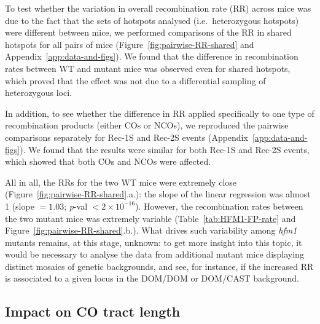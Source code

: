 To test whether the variation in overall recombination rate (RR) across mice was due to the fact that the sets of hotspots analysed (i.e.\ heterozygous hotspots) were different between mice, we performed comparisons of the RR in shared hotspots for all pairs of mice (Figure~\ref{fig:pairwise-RR-shared} and Appendix~\ref{app:data-and-figs}).
We found that the difference in recombination rates between WT and mutant mice was observed even for shared hotspots, which proved that the effect was not due to a differential sampling of heterozygous loci.

\begin{mccorrection}
In addition, to see whether the difference in RR applied specifically to one type of recombination products (either COs or NCOs), we reproduced the pairwise comparisons separately for Rec-1S and Rec-2S events (Appendix~\ref{app:data-and-figs}).
We found that the results were similar for both Rec-1S and Rec-2S events, which showed that both COs and NCOs were affected.
\end{mccorrection}

All in all, the RRs for the two WT mice were extremely close (Figure~\ref{fig:pairwise-RR-shared}.a.): the slope of the linear regression was almost 1 (slope $=1.03$; \textit{p}-val $<2 \times 10^{-16}$).
However, the recombination rates between the two mutant mice was extremely variable (Table~\ref{tab:HFM1-FP-rate} and Figure~\ref{fig:pairwise-RR-shared}.b.).
What drives such variability among \textit{hfm1} mutants remains, at this stage, unknown: to get more insight into this topic, it would be necessary to analyse the data from additional mutant mice displaying distinct mosaics of genetic backgrounds, and see, for instance, if the increased RR is associated to a given locus in the DOM/DOM or DOM/CAST background.


\subsection{Impact on CO tract length}


